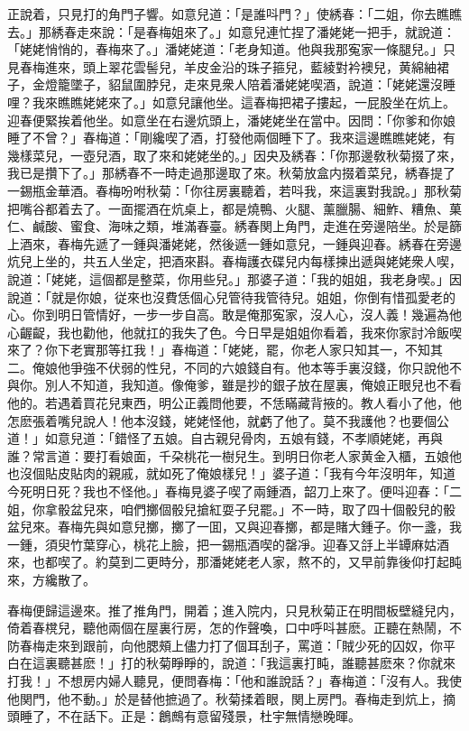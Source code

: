 正說着，只見打的角門子響。如意兒道：「是誰呌門？」使綉春：「二姐，你去瞧瞧去。」那綉春走來說：「是春梅姐來了。」如意兒連忙捏了潘姥姥一把手，就說道：「姥姥悄悄的，春梅來了。」潘姥姥道：「老身知道。他與我那寃家一條腿兒。」只見春梅進來，頭上翠花雲髻兒，羊皮金沿的珠子箍兒，藍綾對衿襖兒，黄綿紬裙子，金燈籠墜子，貂鼠圍脖兒，走來見衆人陪着潘姥姥喫酒，說道：「姥姥還沒睡哩？我來瞧瞧姥姥來了。」如意兒讓他坐。這春梅把裙子摟起，一屁股坐在炕上。迎春便緊挨着他坐。如意坐在右邊炕頭上，潘姥姥坐在當中。因問：「你爹和你娘睡了不曾？」春梅道：「剛纔喫了酒，打發他兩個睡下了。我來這邊瞧瞧姥姥，有幾樣菜兒，一壺兒酒，取了來和姥姥坐的。」因央及綉春：「你那邊敎秋菊掇了來，我已是攢下了。」那綉春不一時走過那邊取了來。秋菊放盒内掇着菜兒，綉春提了一錫瓶金華酒。春梅吩咐秋菊：「你往房裏聽着，若呌我，來這裏對我說。」那秋菊把嘴谷都着去了。一面擺酒在炕桌上，都是燒鴨、火腿、薰臘腸、細鮓、糟魚、菓仁、鹹酸、蜜食、海味之類，堆滿春臺。綉春関上角門，走進在旁邊陪坐。於是篩上酒來，春梅先遞了一鍾與潘姥姥，然後遞一鍾如意兒，一鍾與迎春。綉春在旁邊炕兒上坐的，共五人坐定，把酒來斟。春梅護衣碟兒内每樣揀出遞與姥姥衆人喫，說道：「姥姥，這個都是整菜，你用些兒。」那婆子道：「我的姐姐，我老身喫。」因說道：「就是你娘，従來也沒費恁個心兒管待我管待兒。姐姐，你倒有惜孤愛老的心。你到明日管情好，一步一步自高。敢是俺那寃家，沒人心，沒人義！幾遍為他心齷齪，我也勸他，他就扛的我失了色。今日早是姐姐你看着，我來你家討冷飯喫來了？你下老實那等扛我！」春梅道：「姥姥，罷，你老人家只知其一，不知其二。俺娘他爭強不伏弱的性兒，不同的六娘錢自有。他本等手裏沒錢，你只說他不與你。別人不知道，我知道。像俺爹，雖是抄的銀子放在屋裏，俺娘正眼兒也不看他的。若遇着買花兒東西，明公正義問他要，不恁瞞藏背掖的。教人看小了他，他怎麽張着嘴兒說人！他本沒錢，姥姥怪他，就虧了他了。莫不我護他？也要個公道！」如意兒道：「錯怪了五娘。自古親兒骨肉，五娘有錢，不孝順姥姥，再與誰？常言道：要打看娘面，千朶桃花一樹兒生。到明日你老人家黄金入櫃，五娘他也沒個貼皮貼肉的親戚，就如死了俺娘樣兒！」婆子道：「我有今年沒明年，知道今死明日死？我也不怪他。」春梅見婆子喫了兩鍾酒，韶刀上來了。便呌迎春：「二姐，你拿骰盆兒來，咱們擲個骰兒搶紅耍子兒罷。」不一時，取了四十個骰兒的骰盆兒來。春梅先與如意兒擲，擲了一囬，又與迎春擲，都是賭大鍾子。你一盞，我一鍾，須臾竹葉穿心，桃花上臉，把一錫瓶酒喫的罄凈。迎春又㧱上半罈麻姑酒來，也都喫了。約莫到二更時分，那潘姥姥老人家，熬不的，又早前靠後仰打起盹來，方纔散了。

春梅便歸這邊來。推了推角門，開着；進入院内，只見秋菊正在明間板壁縫兒内，倚着春櫈兒，聽他兩個在屋裏行房，怎的作聲喚，口中呼呌甚麽。正聽在熱鬧，不防春梅走來到跟前，向他腮頰上儘力打了個耳刮子，罵道：「賊少死的囚奴，你平白在這裏聽甚麽！」打的秋菊睜睜的，說道：「我這裏打盹，誰聽甚麽來？你就來打我！」不想房内婦人聽見，便問春梅：「他和誰說話？」春梅道：「沒有人。我使他関門，他不動。」於是替他摭過了。秋菊揉着眼，関上房門。春梅走到炕上，摘頭睡了，不在話下。正是：鶬鷓有意留殘景，杜宇無情戀晚暉。

